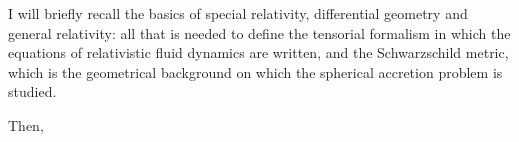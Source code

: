 \documentclass[main.tex]{subfiles}
\begin{document}
I will briefly recall the basics of special relativity, differential geometry and general relativity: all that is needed to define the tensorial formalism in which the equations of relativistic fluid dynamics are written, and the Schwarzschild metric, which is the geometrical background on which the spherical accretion problem is studied.

Then, 
\end{document}
